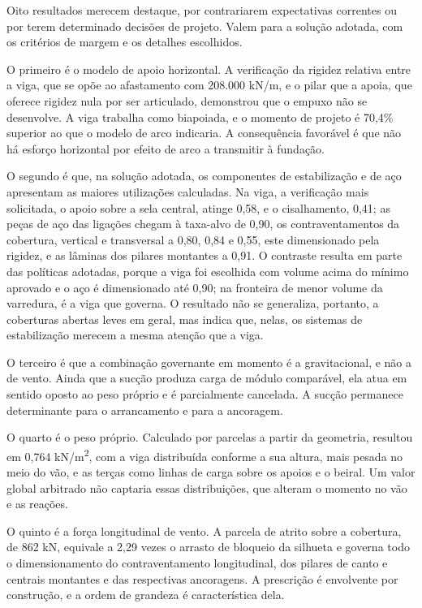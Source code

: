 Oito resultados merecem destaque, por contrariarem expectativas correntes ou por
terem determinado decisões de projeto. Valem para a solução adotada, com os
critérios de margem e os detalhes escolhidos.

O primeiro é o modelo de apoio horizontal. A verificação da rigidez relativa
entre a viga, que se opõe ao afastamento com 208.000 kN/m, e o pilar que a
apoia, que oferece rigidez nula por ser articulado, demonstrou que o empuxo não
se desenvolve. A viga trabalha como biapoiada, e o momento de projeto é 70,4\%
superior ao que o modelo de arco indicaria. A consequência favorável é que não
há esforço horizontal por efeito de arco a transmitir à fundação.

O segundo é que, na solução adotada, os componentes de estabilização e de aço
apresentam as maiores utilizações calculadas. Na viga, a verificação mais
solicitada, o apoio sobre a sela central, atinge 0,58, e o cisalhamento, 0,41;
as peças de aço das ligações chegam à taxa-alvo de 0,90, os contraventamentos da
cobertura, vertical e transversal a 0,80, 0,84 e 0,55, este dimensionado pela
rigidez, e as lâminas dos pilares montantes a 0,91. O contraste resulta em parte
das políticas adotadas, porque a viga foi escolhida com volume acima do mínimo
aprovado e o aço é dimensionado até 0,90; na fronteira de menor volume da
varredura, é a viga que governa. O resultado não se generaliza, portanto, a
coberturas abertas leves em geral, mas indica que, nelas, os sistemas de
estabilização merecem a mesma atenção que a viga.

O terceiro é que a combinação governante em momento é a gravitacional, e não a
de vento. Ainda que a sucção produza carga de módulo comparável, ela atua em
sentido oposto ao peso próprio e é parcialmente cancelada. A sucção permanece
determinante para o arrancamento e para a ancoragem.

O quarto é o peso próprio. Calculado por parcelas a partir da geometria,
resultou em 0,764 kN/m\textsuperscript{2}, com a viga distribuída conforme a sua
altura, mais pesada no meio do vão, e as terças como linhas de carga sobre os
apoios e o beiral. Um valor global arbitrado não captaria essas distribuições,
que alteram o momento no vão e as reações.

O quinto é a força longitudinal de vento. A parcela de atrito sobre a cobertura,
de 862 kN, equivale a 2,29 vezes o arrasto de bloqueio da silhueta e governa
todo o dimensionamento do contraventamento longitudinal, dos pilares de canto e centrais montantes e
das respectivas ancoragens. A prescrição é envolvente por construção, e a ordem
de grandeza é característica dela.

